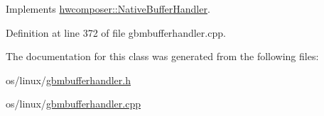 Implements \mbox{\hyperlink{classhwcomposer_1_1NativeBufferHandler_ae0da63bfef3f8342460fa1a958f8359c}{hwcomposer\+::\+Native\+Buffer\+Handler}}.



Definition at line 372 of file gbmbufferhandler.\+cpp.


\begin{DoxyCode}{0}
\end{DoxyCode}


The documentation for this class was generated from the following files\+:\begin{DoxyCompactItemize}
\item 
os/linux/\mbox{\hyperlink{gbmbufferhandler_8h}{gbmbufferhandler.\+h}}\item 
os/linux/\mbox{\hyperlink{gbmbufferhandler_8cpp}{gbmbufferhandler.\+cpp}}\end{DoxyCompactItemize}
